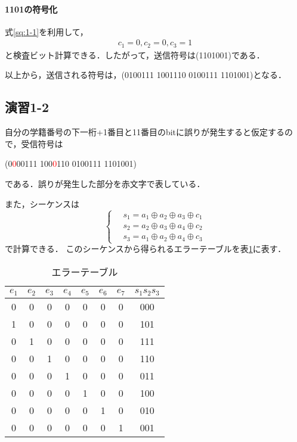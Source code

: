\documentclass[documentclass]{jsarticle}
\newcommand{\red}[1]{\textcolor{red}{#1}}
\begin{document}
\paragraph*{1101の符号化}
式\ref*{sq:1-1}を利用して，
\begin{align*}
  c_1 = 0, c_2 = 0, c_3 = 1
\end{align*}
と検査ビット計算できる．したがって，送信符号は(1101001)である．

以上から，送信される符号は，(0100111 1001110 0100111 1101001)となる．

\subsection*{演習1-2}
自分の学籍番号の下一桁+1番目と11番目のbitに誤りが発生すると仮定するので，受信符号は
\begin{center}
  (0\red{0}00111 100\red{0}110 0100111 1101001)
\end{center}
である．誤りが発生した部分を赤文字で表している．
\newpage

また，シーケンスは
\begin{equation}
  \left\{ \,
    \begin{aligned}
      &s_1 = a_1 \oplus a_2 \oplus a_3 \oplus c_1\\
      &s_2 = a_2 \oplus a_3 \oplus a_4 \oplus c_2\\
      &s_3 = a_1 \oplus a_2 \oplus a_4 \oplus c_3
    \end{aligned}
  \right.
  \label{sq:1-2}
\end{equation}
で計算できる．
このシーケンスから得られるエラーテーブルを表\ref*{tb:1-1}に表す．
\begin{table}[H]
  \begin{center}
    \caption{エラーテーブル}
    \label{tb:1-1}
    \begin{tabular}{|ccccccc|c|} \hline
     $e_1$ & $e_2$ & $e_3$ & $e_4$ & $e_5$ & $e_6$ & $e_7$ & $s_1 s_2 s_3$ \\ \hline
     0 & 0 & 0 & 0 & 0 & 0 & 0 & 000 \\ 
     1 & 0 & 0 & 0 & 0 & 0 & 0 & 101 \\ 
     0 & 1 & 0 & 0 & 0 & 0 & 0 & 111 \\ 
     0 & 0 & 1 & 0 & 0 & 0 & 0 & 110 \\ 
     0 & 0 & 0 & 1 & 0 & 0 & 0 & 011 \\ 
     0 & 0 & 0 & 0 & 1 & 0 & 0 & 100 \\ 
     0 & 0 & 0 & 0 & 0 & 1 & 0 & 010 \\ 
     0 & 0 & 0 & 0 & 0 & 0 & 1 & 001 \\ \hline
    \end{tabular}
  \end{center}
\end{table}
\end{document}
